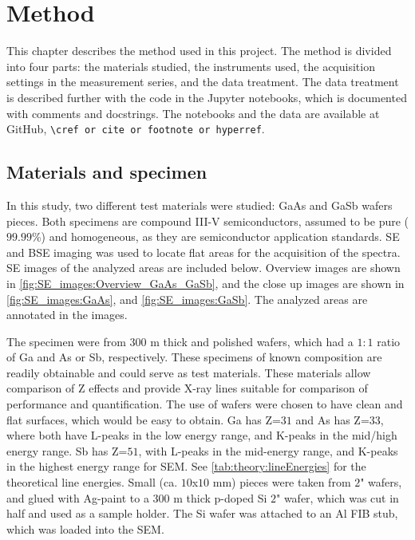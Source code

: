 \chapter{Method}
\label{ch:method}

This chapter describes the method used in this project.
The method is divided into four parts: the materials studied, the instruments used, the acquisition settings in the measurement series, and the data treatment.
The data treatment is described further with the code in the Jupyter notebooks, which is documented with comments and docstrings.
The notebooks and the data are available at GitHub, \verb|\cref or cite or footnote or hyperref|.





\section{Materials and specimen}
\label{method:materials}

In this study, two different test materials were studied: GaAs and GaSb wafers pieces.
Both specimens are compound III-V semiconductors, assumed to be pure ($99.99$\%) and homogeneous, as they are semiconductor application standards.
SE and BSE imaging was used to locate flat areas for the acquisition of the spectra.
SE images of the analyzed areas are included below.
Overview images are shown in \cref{fig:SE_images:Overview_GaAs_GaSb}, and the close up images are shown in \cref{fig:SE_images:GaAs}, and \cref{fig:SE_images:GaSb}. %
The analyzed areas are annotated in the images.


The specimen were from $300$ \textmu m thick and polished wafers, which had a $1:1$ ratio of Ga and As or Sb, respectively.
These specimens of known composition are readily obtainable and could serve as test materials.
These materials allow comparison of Z effects and provide X-ray lines suitable for comparison of performance and quantification.
The use of wafers were chosen to have clean and flat surfaces, which would be easy to obtain.
Ga has Z=$31$ and As has Z=$33$, where both have L-peaks in the low energy range, and K-peaks in the mid/high energy range.
Sb has Z=$51$, with L-peaks in the mid-energy range, and K-peaks in the highest energy range for SEM.
See \cref{tab:theory:lineEnergies} for the theoretical line energies.
Small (ca. $10$x$10$ mm) pieces were taken from $2$" wafers, and glued with Ag-paint to a $300$ \textmu m thick p-doped Si $2$" wafer, which was cut in half and used as a sample holder.
The Si wafer was attached to an Al FIB stub, which was loaded into the SEM.


